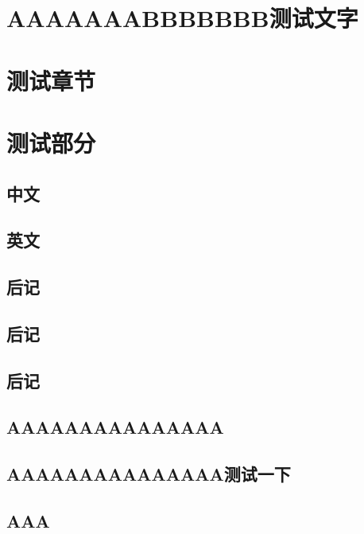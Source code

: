 \documentclass[color=green]{textbook-cn}%
\begin{document}
\part*{AAAAAAABBBBBBB测试文字}
\part{测试章节}
\part[宝贝儿]{测试部分}


\lipsum

\begin{Appendix}

\chapter[PPPPPLLL]{中文}
\thepart\zhlipsum

\chapter{英文}
\zhlipsum
\end{Appendix}



\chapter{后记}
\thechapter
\zhlipsum\zhlipsum
\chapter[我爱你]{后记}
\thechapter
\zhlipsum\zhlipsum
\chapter*{后记}



\chapter*[我讨厌你]{AAAAAAAAAAAAAAA}
\zhlipsum\zhlipsum

\chapter*{AAAAAAAAAAAAAAA测试一下}

\zhlipsum\zhlipsum

\chapter*{AAA}
\end{document}
